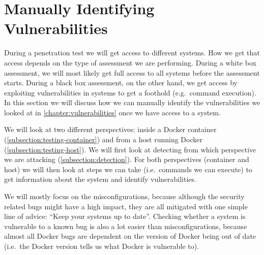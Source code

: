 \section{Manually Identifying Vulnerabilities}\label{section:identify-vulnerabilities}
During a penetration test we will get access to different systems. How we get that access depends on the type of assessment we are performing. During a white box assessment, we will most likely get full access to all systems before the assessment starts. During a black box assessment, on the other hand, we get access by exploiting vulnerabilities in systems to get a foothold (e.g.\ command execution). In this section we will discuss how we can manually identify the vulnerabilities we looked at in \autoref{chapter:vulnerabilities} once we have access to a system.

We will look at two different perspectives: inside a Docker container (\autoref{subsection:testing-container}) and from a host running Docker (\autoref{subsection:testing-host}). We will first look at detecting from which perspective we are attacking (\autoref{subsection:detection}). For both perspectives (container and host) we will then look at steps we can take (i.e.\ commands we can execute) to get information about the system and identify vulnerabilities.

\medskip

We will mostly focus on the misconfigurations, because although the security related bugs might have a high impact, they are all mitigated with one simple line of advice: ``Keep your systems up to date''. Checking whether a system is vulnerable to a known bug is also a lot easier than misconfigurations, because almost all Docker bugs are dependent on the version of Docker being out of date (i.e.\ the Docker version tells us what Docker is vulnerable to).



